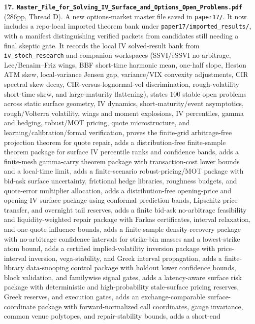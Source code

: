 \documentclass[11pt]{article}
\begin{document}
\textbf{17. \texttt{Master\_File\_for\_Solving\_IV\_Surface\_and\_Options\_Open\_Problems.pdf}}
(286pp, Thread D).  A new options-market master file saved in
\texttt{paper17/}.  It now includes a repo-local imported theorem bank under
\texttt{paper17/imported\_results/}, with a manifest distinguishing verified
packets from candidates still needing a final skeptic gate.  It records the
local IV solved-result bank from \texttt{iv\_stoch\_research} and companion
workspaces (SSVI/eSSVI no-arbitrage, Lee/Benaim--Friz wings,
BBF short-time harmonic mean, one-half slope, Heston ATM skew, local-variance
Jensen gap, variance/VIX convexity adjustments, CIR spectral skew decay,
CIR-versus-lognormal-vol discrimination, rough-volatility short-time skew, and
large-maturity flattening), states 100 stable open problems across static
surface geometry, IV dynamics, short-maturity/event asymptotics, rough/Volterra
volatility, wings and moment explosions, IV percentiles, gamma and hedging,
robust/MOT pricing, quote microstructure, and learning/calibration/formal
verification, proves the finite-grid arbitrage-free projection theorem for
quote repair, adds a distribution-free finite-sample theorem package for
surface IV percentile ranks and confidence bands, adds a finite-mesh
gamma-carry theorem package with transaction-cost lower bounds and a local-time
limit, adds a finite-scenario robust-pricing/MOT package with bid-ask surface
uncertainty, frictional hedge libraries, roughness budgets, and quote-error
multiplier allocation, adds a distribution-free opening-price and opening-IV
surface package using conformal prediction bands, Lipschitz price transfer, and
overnight tail reserves, adds a finite bid-ask no-arbitrage feasibility and
liquidity-weighted repair package with Farkas certificates, interval relaxation,
and one-quote influence bounds, adds a finite-sample density-recovery package
with no-arbitrage confidence intervals for strike-bin masses and a lowest-strike
atom bound, adds a certified implied-volatility inversion package with
price-interval inversion, vega-stability, and Greek interval propagation, adds a
finite-library data-snooping control package with holdout lower confidence
bounds, block validation, and familywise signal gates, adds a latency-aware
surface risk package with deterministic and high-probability stale-surface
pricing reserves, Greek reserves, and execution gates, adds an exchange-comparable
surface-coordinate package with forward-normalized call coordinates, gauge
invariance, common venue polytopes, and repair-stability bounds, adds a short-end
\end{document}
